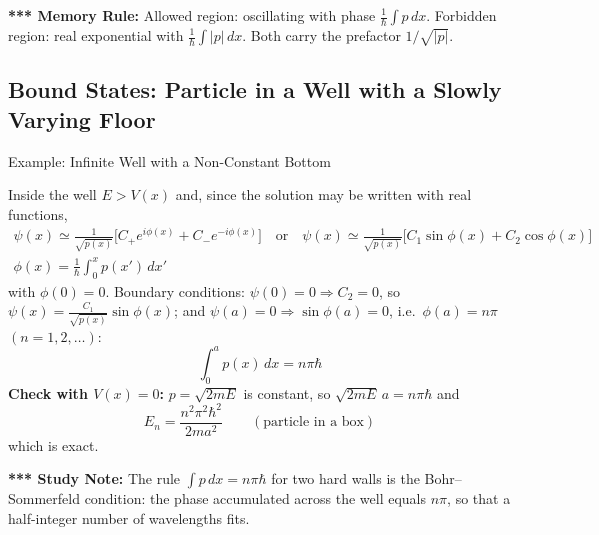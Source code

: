 \documentclass[11pt,a4paper]{article}
\begin{document}
\textbf{*** Memory Rule:} Allowed region: oscillating with phase $\frac1\hbar\int p\,dx$. Forbidden region: real exponential with $\frac1\hbar\int|p|\,dx$. Both carry the prefactor $1/\sqrt{|p|}$.

\subsection{Bound States: Particle in a Well with a Slowly Varying Floor}
\begin{prob}{Example: Infinite Well with a Non-Constant Bottom}
\begin{center}
\end{center}
Inside the well $E>V(x)$ and, since the solution may be written with real functions,
\begin{gather*}
\psi(x)\simeq\frac1{\sqrt{p(x)}}\Big[C_+e^{i\phi(x)} + C_-e^{-i\phi(x)}\Big]
\quad\text{or}\quad
\psi(x)\simeq\frac{1}{\sqrt{p(x)}}\Big[C_1\sin\phi(x) + C_2\cos\phi(x)\Big]\\
\phi(x) = \frac1\hbar\int_0^xp(x')\,dx'
\end{gather*}
with $\phi(0)=0$. Boundary conditions: $\psi(0)=0\Rightarrow C_2=0$, so $\psi(x) = \frac{C_1}{\sqrt{p(x)}}\sin\phi(x)$; and $\psi(a)=0\Rightarrow\sin\phi(a)=0$, i.e.\ $\phi(a)=n\pi$ $(n=1,2,\ldots)$:
\[
\boxed{\int_0^ap(x)\,dx = n\pi\hbar}
\]
\textbf{Check with $V(x)=0$:} $p=\sqrt{2mE}$ is constant, so $\sqrt{2mE}\,a = n\pi\hbar$ and
\[
E_n = \frac{n^2\pi^2\hbar^2}{2ma^2}\qquad(\text{particle in a box})
\]
which is exact.
\end{prob}
\textbf{*** Study Note:} The rule $\int p\,dx = n\pi\hbar$ for two hard walls is the Bohr--Sommerfeld condition: the phase accumulated across the well equals $n\pi$, so that a half-integer number of wavelengths fits.
\end{document}
